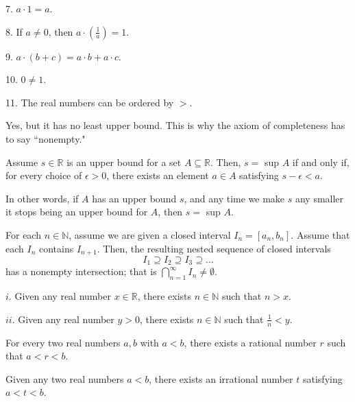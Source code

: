 \documentclass{article}
\begin{document}
    7. $a \cdot 1 = a$.
    
    8. If $a \neq 0$, then $a \cdot (\frac 1 a) = 1$.
    
    9. $a \cdot (b + c) = a \cdot b + a \cdot c$.
    
    10. $0 \neq 1$.
    
    11. The real numbers can be ordered by $>$.

\medskip
{}

    Yes, but it has no least upper bound. This is why the axiom of completeness has to say ``nonempty."

\medskip
{}

    Assume $s \in \mathbb R$ is an upper bound for a set $A \subseteq \mathbb R$. Then, $s =$ sup $A$ if and only if, for every choice of $\epsilon > 0$, there exists an element $a \in A$ satisfying $s - \epsilon < a$.
    
    In other words, if $A$ has an upper bound $s$, and any time we make $s$ any smaller it stops being an upper bound for $A$, then $s=$ sup $A$.

\medskip
{}

    For each $n \in \mathbb N$, assume we are given a closed interval $I_n = [a_n, b_n]$. Assume that each $I_n$ contains $I_{n+1}$. Then, the resulting nested sequence of closed intervals $$I_1 \supseteq I_2 \supseteq I_3 \supseteq \hdots$$ has a nonempty intersection; that is $\bigcap\limits_{n=1}^\infty I_n \neq \emptyset$.
    
\medskip
{}

    $i$. Given any real number $x \in \mathbb R$, there exists $n \in \mathbb N$ such that $n > x$.
    
    $ii$. Given any real number $y > 0$, there exists $n \in \mathbb N$ such that $\frac 1 n < y$.

\medskip
{}

    For every two real numbers $a, b$ with $a < b$, there exists a rational number $r$ such that $a < r < b$.

\medskip
{}

    Given any two real numbers $a < b$, there exists an irrational number $t$ satisfying $a < t < b$.
\end{document}
